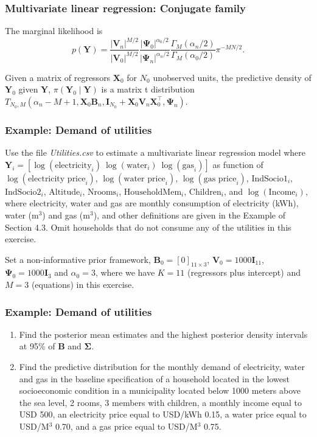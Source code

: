 \documentclass[12pt, compress]{beamer}
\begin{document}
\begin{frame}
	\frametitle{Multivariate linear regression: Conjugate family}
	
The marginal likelihood is
$$p({\bm{Y}})=\frac{|{\bm{V}}_n|^{M/2}}{|{\bm{V}}_0|^{M/2}}\frac{|{\bm{\Psi}}_0|^{\alpha_0/2}}{|{\bm{\Psi}}_n|^{\alpha_n/2}}\frac{\Gamma_M(\alpha_n/2)}{\Gamma_M(\alpha_0/2)}\pi^{-MN/2}.$$
	
Given a matrix of regressors ${\bm{X}}_0$ for $N_0$ unobserved units, the predictive density of ${\bm{Y}}_0$ given ${\bm{Y}}$, $\pi({\bm{Y}}_0\mid {\bm{Y}})$ is a matrix t distribution $T_{N_0,M}(\alpha_n-M+1,{\bm{X}}_0{\bm{B}}_n,{\bm{I}}_{N_0}+{\bm{X}}_0{\bm{V}}_n{\bm{X}}_0^{\top},{\bm{\Psi}}_n)$.
\end{frame}
\begin{frame}
	\frametitle{Example: Demand of utilities}
Use the file \textit{Utilities.csv} to estimate a multivariate linear regression model where $\mathbf{Y}_i=\left[\log(\text{electricity}_i) \ \log(\text{water}_i) \ \log(\text{gas}_i)\right]$ as function of $\log(\text{electricity price}_i)$, $\log(\text{water price}_i)$, $\log(\text{gas price}_i)$, $\text{IndSocio1}_i$, $\text{IndSocio2}_i$, $\text{Altitude}_i$, $\text{Nrooms}_i$, $\text{HouseholdMem}_i$, $\text{Children}_i$, and $\log(\text{Income}_i)$, where electricity, water and gas are monthly consumption of electricity (kWh), water (m$^3$) and gas (m$^3$), and other definitions are given in the Example of Section 4.3. Omit households that do not consume any of the utilities in this exercise. 

Set a non-informative prior framework, $\mathbf{B}_0=\left[0\right]_{11\times 3}$, $\mathbf{V}_0=1000 \mathbf{I}_{11}$, $\mathbf{\Psi}_0=1000 \mathbf{I}_{3}$ and $\alpha_0=3$, where we have $K=11$ (regressors plus intercept) and $M=3$ (equations) in this exercise.
\end{frame}

\begin{frame}
	\frametitle{Example: Demand of utilities}
\begin{enumerate}
	\item Find the posterior mean estimates and the highest posterior density intervals at 95\% of $\mathbf{B}$ and $\mathbf{\Sigma}$.

	\item Find the predictive distribution for the monthly demand of electricity, water and gas in the baseline specification of a household located in the lowest socioeconomic condition in a municipality located below 1000 meters above the sea level, 2 rooms, 3 members with children, a monthly income equal to USD 500, an electricity price equal to USD/kWh 0.15, a water price equal to USD/M$^3$ 0.70, and a gas price equal to USD/M$^3$ 0.75. 
\end{enumerate} 
\end{frame}

%		
\end{document}

